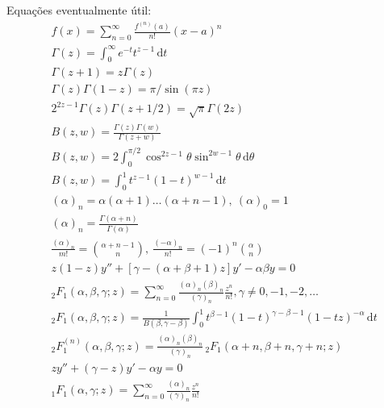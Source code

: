 \documentclass[a4paper,12pt, leqno, answers]{exam}
\begin{document}
\thispagestyle{empty}

\newpage
\setcounter{page}{1}
Equa\c{c}\~{o}es eventualmente útil:
\begin{align}
    & f(x) = \sum_{n = 0}^\infty \frac{f^{(n)}(a)}{n!} (x - a)^n \tag{ST} \label{eq:ser_taylor} \\
    & \Gamma(z) = \int_0^\infty e^{-t} t^{z - 1} \,\mathrm{d}t \tag{GE} \label{eq:gamma_euler} \\
    & \Gamma(z + 1) = z \Gamma(z) \label{eq:gamma_rel} \\
    & \Gamma(z) \Gamma(1 - z) = \pi / \sin(\pi z) \label{eq:gamma_sin} \\
    & 2^{2 z - 1} \Gamma(z) \Gamma(z + 1/2) = \sqrt{\pi} \Gamma(2 z) \label{eq:gamma_dup_legendre} \\
    & B(z, w) = \frac{\Gamma(z) \Gamma(w)}{\Gamma(z + w)} \tag{BG} \label{eq:beta} \\
    & B(z, w) = 2 \int_0^{\pi / 2} \cos^{2z - 1} \theta \sin^{2w - 1} \theta \,\mathrm{d}\theta \tag{BT} \label{eq:beta_trig} \\
    & B(z, w) = \int_0^1 t^{z - 1} (1 - t)^{w - 1} \,\mathrm{d}t \tag{BI} \label{eq:beta_int} \\
    & (\alpha)_n = \alpha (\alpha + 1) \ldots (\alpha + n - 1), \ (\alpha)_0 = 1 \tag{SP} \label{eq:sim_poch} \\
    & (\alpha)_n = \frac{\Gamma(\alpha + n)}{\Gamma(\alpha)} \label{eq:sim_poch_gamma} \\
    & \frac{(\alpha)_n}{m!} = \binom{\alpha + n - 1}{n}, \ \frac{(-\alpha)_n}{n!} = (-1)^n \binom{\alpha}{n} \label{eq:sim_poch_binom} \\
    & z(1 - z)y'' + \left[ \gamma - (\alpha + \beta + 1) z \right] y' - \alpha \beta y = 0 \tag{EH} \label{eq:hiperg} \\
    & {}_2F_1(\alpha, \beta, \gamma; z) = \sum_{n = 0}^\infty \frac{(\alpha)_n (\beta)_n}{(\gamma)_n} \frac{z^n}{n!}, \gamma \neq 0, -1, -2, \ldots \tag{RSHF} \label{eq:hiperg_ser} \\
    & {}_2F_1(\alpha, \beta, \gamma; z) = \frac{1}{B(\beta, \gamma - \beta)} \int_0^1 t^{\beta - 1} (1- t)^{\gamma - \beta - 1} (1 - tz)^{-\alpha} \,\mathrm{d}t \tag{RIFH}\label{eq:hiperg_int} \\
    & {}_2F_1^{(n)}(\alpha, \beta, \gamma; z) = \frac{(\alpha)_n (\beta)_n}{(\gamma)_n} \,{}_2F_1(\alpha + n, \beta + n, \gamma + n; z) \label{eq:hiperg_der} \\
    & zy'' + (\gamma - z)y' - \alpha y = 0 \tag{EHC} \label{eq:hiper_con} \\
    & {}_1F_1(\alpha, \gamma; z) = \sum_{n = 0}^\infty \frac{(\alpha)_n}{(\gamma)_n} \frac{z^n}{n!} \tag{RSFHC} \label{eq:hiperg_con_ser}
\end{align}
\end{document}
